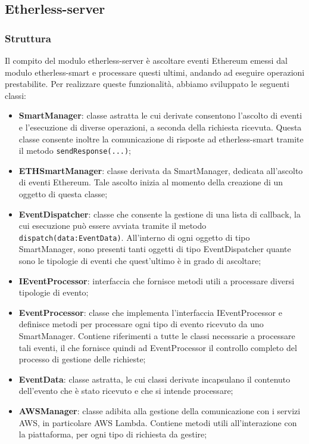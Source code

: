 \subsection{Etherless-server}
\subsubsection{Struttura}
Il compito del modulo etherless-server è ascoltare eventi Ethereum emessi dal modulo etherless-smart e processare questi ultimi, andando ad eseguire operazioni prestabilite. Per realizzare queste funzionalità, abbiamo sviluppato le seguenti classi:
\begin{itemize}
	\item \textbf{SmartManager}: classe astratta le cui derivate consentono l'ascolto di eventi e l'esecuzione di diverse operazioni, a seconda della richiesta ricevuta. Questa classe consente inoltre la comunicazione di risposte ad etherless-smart tramite il metodo \texttt{sendResponse(...)};
	\item \textbf{ETHSmartManager}: classe derivata da SmartManager, dedicata all'ascolto di eventi Ethereum. Tale ascolto inizia al momento della creazione di un oggetto di questa classe;
	\item \textbf{EventDispatcher}: classe che consente la gestione di una lista di callback, la cui esecuzione può essere avviata tramite il metodo \texttt{dispatch(data:EventData)}. All'interno di ogni oggetto di tipo SmartManager, sono presenti tanti oggetti di tipo EventDispatcher quante sono le tipologie di eventi che quest'ultimo è in grado di ascoltare;
	\item \textbf{IEventProcessor}: interfaccia che fornisce metodi utili a processare diversi tipologie di evento;
	\item \textbf{EventProcessor}: classe che implementa l'interfaccia IEventProcessor e definisce metodi per processare ogni tipo di evento ricevuto da uno SmartManager. Contiene riferimenti a tutte le classi necessarie a processare tali eventi, il che fornisce quindi ad EventProcessor il controllo completo del processo di gestione delle richieste;
	\item \textbf{EventData}: classe astratta, le cui classi derivate incapsulano il contenuto dell'evento che è stato ricevuto e che si intende processare;
	\item \textbf{AWSManager}: classe adibita alla gestione della comunicazione con i servizi AWS, in particolare AWS Lambda. Contiene metodi utili all'interazione con la piattaforma, per ogni tipo di richiesta da gestire;

\end{itemize}
